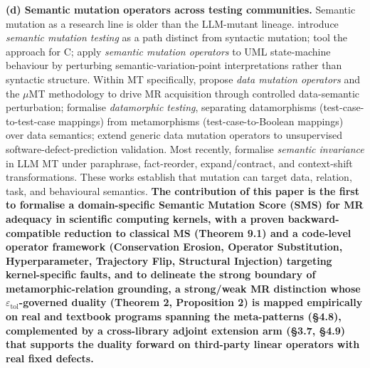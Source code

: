 \documentclass[review,12pt,authoryear]{elsarticle}
\begin{document}
\textbf{(d) Semantic mutation operators across testing communities.}
Semantic mutation as a research line is older than the LLM-mutant
lineage. \citet{7a6c280d9584691800e71876c716ea229335abeb} introduce \emph{semantic
mutation testing} as a path distinct from syntactic mutation; \citet{dan2012smtc}
tool the approach for C; \citet{derezinska2019uml}
apply \emph{semantic mutation operators} to UML state-machine behaviour
by perturbing semantic-variation-point interpretations rather than
syntactic structure. Within MT specifically, \citet{sun2016mumt,sun2024datamutation}
propose \emph{data mutation operators} and the $\mu$MT methodology to drive
MR acquisition through controlled data-semantic perturbation; \citet{zhu2020datamorphic}
formalise \emph{datamorphic testing}, separating
datamorphisms (test-case-to-test-case mappings) from metamorphisms
(test-case-to-Boolean mappings) over data semantics; \citet{chan2024metamorphic}
extend generic data mutation operators to unsupervised
software-defect-prediction validation. Most recently, \citet{0fa97cc4e2a0ffb6a777669b1b541c0372fac0d2}
formalise \emph{semantic invariance} in LLM MT under paraphrase,
fact-reorder, expand/contract, and context-shift transformations. These
works establish that mutation can target data, relation, task, and
behavioural semantics. \textbf{The contribution of this paper is the
first to formalise a domain-specific Semantic Mutation Score (SMS) for
MR adequacy in scientific computing kernels, with a proven
backward-compatible reduction to classical MS (Theorem 9.1) and a
code-level operator framework (Conservation Erosion, Operator
Substitution, Hyperparameter, Trajectory Flip, Structural Injection)
targeting kernel-specific faults, and to delineate the strong boundary
of metamorphic-relation grounding, a strong/weak MR distinction whose
$\varepsilon_{\mathrm{tol}}$-governed duality (Theorem 2, Proposition 2)
is mapped empirically on real and textbook programs spanning the
meta-patterns (§4.8), complemented by a cross-library adjoint extension
arm (§3.7, §4.9) that supports the duality forward on third-party
linear operators with real fixed defects.}
\end{document}
